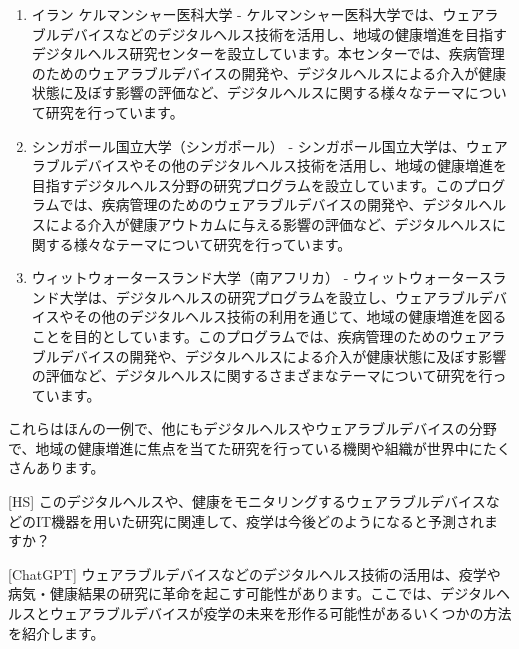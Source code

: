 \documentclass[
]{bxjsbook}
\providecommand{\tightlist}{%
  \setlength{\itemsep}{0pt}\setlength{\parskip}{0pt}}
\theoremstyle{definition}
\theoremstyle{definition}
\theoremstyle{definition}
\theoremstyle{definition}
\theoremstyle{remark}
\begin{document}
\begin{enumerate}
\def\labelenumi{\arabic{enumi}.}
\tightlist
\item
  イラン ケルマンシャー医科大学 - ケルマンシャー医科大学では、ウェアラブルデバイスなどのデジタルヘルス技術を活用し、地域の健康増進を目指すデジタルヘルス研究センターを設立しています。本センターでは、疾病管理のためのウェアラブルデバイスの開発や、デジタルヘルスによる介入が健康状態に及ぼす影響の評価など、デジタルヘルスに関する様々なテーマについて研究を行っています。
\item
  シンガポール国立大学（シンガポール） - シンガポール国立大学は、ウェアラブルデバイスやその他のデジタルヘルス技術を活用し、地域の健康増進を目指すデジタルヘルス分野の研究プログラムを設立しています。このプログラムでは、疾病管理のためのウェアラブルデバイスの開発や、デジタルヘルスによる介入が健康アウトカムに与える影響の評価など、デジタルヘルスに関する様々なテーマについて研究を行っています。
\item
  ウィットウォータースランド大学（南アフリカ） - ウィットウォータースランド大学は、デジタルヘルスの研究プログラムを設立し、ウェアラブルデバイスやその他のデジタルヘルス技術の利用を通じて、地域の健康増進を図ることを目的としています。このプログラムでは、疾病管理のためのウェアラブルデバイスの開発や、デジタルヘルスによる介入が健康状態に及ぼす影響の評価など、デジタルヘルスに関するさまざまなテーマについて研究を行っています。
\end{enumerate}

これらはほんの一例で、他にもデジタルヘルスやウェアラブルデバイスの分野で、地域の健康増進に焦点を当てた研究を行っている機関や組織が世界中にたくさんあります。

{[}HS{]} このデジタルヘルスや、健康をモニタリングするウェアラブルデバイスなどのIT機器を用いた研究に関連して、疫学は今後どのようになると予測されますか？

{[}ChatGPT{]} ウェアラブルデバイスなどのデジタルヘルス技術の活用は、疫学や病気・健康結果の研究に革命を起こす可能性があります。ここでは、デジタルヘルスとウェアラブルデバイスが疫学の未来を形作る可能性があるいくつかの方法を紹介します。
\end{document}
